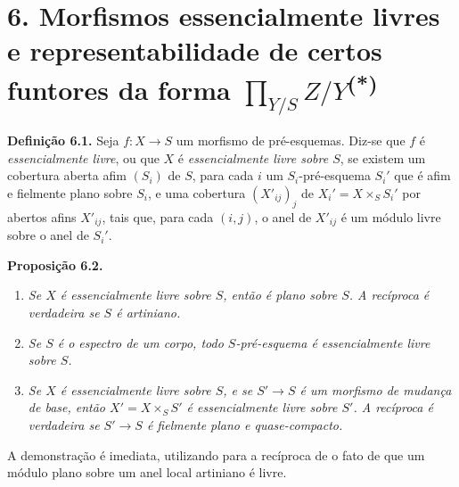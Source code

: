 
\section*{6. Morfismos essencialmente livres e representabilidade de certos funtores da forma \(\prod_{Y/S}Z/Y\)\textsuperscript{(*)}}

\begingroup
\renewcommand{\thefootnote}{(*)}
\endgroup

\noindent{}\textbf{Definição 6.1.}
Seja \(f:X\to S\) um morfismo de pré-esquemas. Diz-se que \(f\) é
\emph{essencialmente livre}, ou que \(X\) é \emph{essencialmente livre sobre
\(S\)}, se existem um cobertura aberta afim \((S_i)\) de \(S\), para
cada \(i\) um \(S_i\)-pré-esquema \(S_i'\) que é afim e fielmente plano
sobre \(S_i\), e uma cobertura \((X'_{ij})_j\) de
\(X_i'=X\times_SS_i'\) por abertos afins \(X'_{ij}\), tais que, para
cada \((i,j)\), o anel de \(X'_{ij}\) é um módulo livre sobre o anel
de \(S_i'\).

\medskip
\noindent{}\textbf{Proposição 6.2.}
\begin{enumerate}
  \item[(a)]
  \textit{Se \(X\) é essencialmente livre sobre \(S\), então é plano
  sobre \(S\). A recíproca é verdadeira se \(S\) é artiniano.}

  \item[(b)]
  \textit{Se \(S\) é o espectro de um corpo, todo \(S\)-pré-esquema é
  essencialmente livre sobre \(S\).}

  \item[(c)]
  \textit{Se \(X\) é essencialmente livre sobre \(S\), e se \(S'\to S\)
  é um morfismo de mudança de base, então \(X'=X\times_SS'\) é
  essencialmente livre sobre \(S'\). A recíproca é verdadeira se \(S'\to S\)
  é fielmente plano e quase-compacto.}
\end{enumerate}

A demonstração é imediata, utilizando para a recíproca de
 o fato de que um
módulo plano sobre um anel local artiniano é livre.

